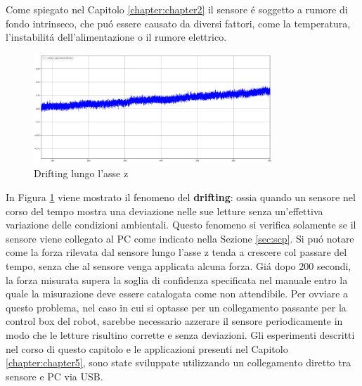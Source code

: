 Come spiegato nel Capitolo \ref{chapter:chapter2} il sensore \'{e} soggetto a rumore di fondo intrinseco, che 
pu\'{o} essere causato da diversi fattori, come la temperatura, l'instabilit\'{a} dell'alimentazione o il rumore elettrico. 
\begin{figure}[H]
    \centering
    \includegraphics*[width=0.80\textwidth]{images/drifting.png}
    \caption{Drifting lungo l'asse z}
    \label{fig:drifting}
\end{figure}
In Figura \ref{fig:drifting} viene mostrato il fenomeno del \textbf{drifting}: ossia quando un sensore nel corso del tempo 
mostra una deviazione nelle sue letture senza un'effettiva variazione delle condizioni ambientali. Questo fenomeno si verifica 
solamente se il sensore viene collegato al PC come indicato nella Sezione \ref{sec:scp}. 
Si pu\'{o} notare come la forza rilevata dal sensore lungo l'asse z tenda a crescere col passare del tempo, senza che al sensore 
venga applicata alcuna forza. Gi\'{a} dopo 200 secondi, la forza misurata supera la soglia di confidenza specificata nel manuale 
entro la quale la misurazione deve essere catalogata come non attendibile.
Per ovviare a questo problema, nel caso in cui si optasse per un collegamento passante per la control box del robot, 
sarebbe necessario azzerare il sensore periodicamente in modo che le letture risultino corrette e senza deviazioni. 
Gli esperimenti descritti nel corso di questo capitolo e le applicazioni presenti nel Capitolo \ref{chapter:chapter5}, sono state 
sviluppate utilizzando un collegamento diretto tra sensore e PC via USB.
